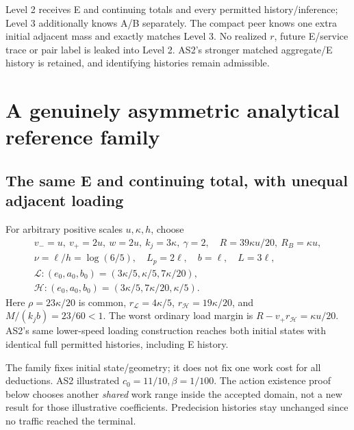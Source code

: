 \documentclass[11pt,a4paper]{article}
\begin{document}
Level 2 receives E and continuing totals and every permitted history/inference;
Level 3 additionally knows A/B separately. The compact peer knows one extra
initial adjacent mass and exactly matches Level 3. No realized $r$, future
E/service trace or pair label is leaked into Level 2. AS2's stronger matched
aggregate/E history is retained, and identifying histories remain admissible.

\section{A genuinely asymmetric analytical reference family}
\subsection{The same E and continuing total, with unequal adjacent loading}
For arbitrary positive scales $u,\kappa,h$, choose
\begin{equation}
 \begin{gathered}
 v_-=u,\ v_+=2u,\ w=2u,\ k_j=3\kappa,\ \gamma=2,\quad
 R=39\kappa u/20,\ R_B=\kappa u,\\
 \nu=\ell/h=\log(6/5),\quad L_p=2\ell,\quad b=\ell,\quad L=3\ell,\\
 \mathcal L:(e_0,a_0,b_0)=(3\kappa/5,\kappa/5,7\kappa/20),\\
 \mathcal H:(e_0,a_0,b_0)=(3\kappa/5,7\kappa/20,\kappa/5).
 \end{gathered}\label{eq:family}
\end{equation}
Here $\rho=23\kappa/20$ is common, $r_{\mathcal L}=4\kappa/5$,
$r_{\mathcal H}=19\kappa/20$, and $M/(k_jb)=23/60<1$.
The worst ordinary load margin is $R-v_+r_{\mathcal H}=\kappa u/20$.
AS2's same lower-speed loading construction reaches both initial states
with identical full permitted histories, including E history.

The family fixes initial state/geometry; it does not fix one work cost for
all deductions. AS2 illustrated $c_0=11/10,\beta=1/100$. The action existence
proof below chooses another \emph{shared} work range inside the accepted
domain, not a new result for those illustrative coefficients. Predecision
histories stay unchanged since no traffic reached the terminal.
\end{document}
